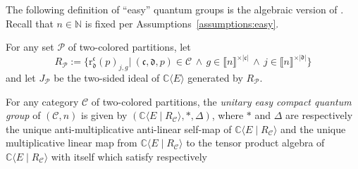 \documentclass[10pt,a4paper]{amsart}
\numberwithin{equation}{section}
\newcommand{\freealg}[2]{#1\langle #2\rangle}
\newcommand{\univalg}[3]{#1\langle #2 \classpredicate #3\rangle}
\newcommand{\Scomultiplication}{\Delta}
\newcommand{\Sstar}{\ast}
\newcommand{\Sand}{\,\wedge\,}
\newcommand{\classpredicate}{\mid}
\newcommand{\pint}{\mathbb{N}}
\newcommand{\comps}{\mathbb{C}}
\newcommand{\dwi}[1]{\llbracket{#1}\rrbracket}
\newcommand{\Ssetmonoidalproduct}{\times}
\newcommand{\Yc}[1]{\mathfrak{#1}}
\newcommand{\Slength}[1]{|#1|}
\newcommand{\therelpoly}[5]{\mathrm{r}^{#1}_{#2}(#3)_{#4,#5}}
\newcommand{\thedim}{n}
\newcommand{\thegens}{E}
\newcommand{\therels}{R}
\newcommand{\thepartrels}[1]{\therels_{#1}}
\newcommand{\thecat}{\mathcal{C}}
\newcommand{\theideal}{J}
\newcommand{\thepartideal}[1]{\theideal_{#1}}
\begin{document}
{
  \newcommand{\thealg}{A}
  \newcommand{\themultiplication}{\Smultiplication}
  \newcommand{\thecomultiplication}{\Scomultiplication}
  \newcommand{\theunit}{\Sunit}
  \newcommand{\thestar}{\Sstar}
  \newcommand{\thecatgen}{\mathcal{G}}
  \newcommand{\thecatgenextended}{\mathcal{R}}
  \newcommand{\indj}{j}
  \newcommand{\indi}{i}
  \newcommand{\indg}{g}
  \newcommand{\indh}{h}
  \newcommand{\incol}{\Yc{c}}
  \newcommand{\outcol}{\Yc{d}}
  \newcommand{\incolx}[1]{\Yc{c}_{#1}}
  \newcommand{\outcolx}[1]{\Yc{d}_{#1}}
  \newcommand{\inlen}{k}
  \newcommand{\outlen}{\ell}
  \newcommand{\infree}{g}
  \newcommand{\outfree}{j}
  \newcommand{\inbound}{h}
  \newcommand{\outbound}{i}
  \newcommand{\infreex}[1]{g_{#1}}
  \newcommand{\outfreex}[1]{j_{#1}}
  \newcommand{\inboundx}[1]{h_{#1}}
  \newcommand{\outboundx}[1]{i_{#1}}
  \newcommand{\incounter}{a}
  \newcommand{\outcounter}{b}
  \newcommand{\thepartition}{p}
  \newcommand{\sumind}{s}
  \newcommand{\anycol}{\Yc{c}}
  \newcommand{\thepartitionset}{\mathcal{P}}
  \newcommand{\theflip}{\SbraidingX{\thealg}{\thealg}}
  \newcommand{\thepolys}{\freealg{\comps}{\thegens}}
      The following definition of ``easy'' quantum groups is the algebraic version of \cite[Definition~5.1]{TarragoWeber2016}. Recall that $\thedim\in\pint$ is fixed per Assumptions~\ref{assumptions:easy}.
      \begin{Notation}
        \label{notation:relations_of_partition_set}
 For any set $\thepartitionset$ of two-colored partitions, let
    \[
      \thepartrels{\thepartitionset} :=\big\{ \therelpoly{\incol}{\outcol}{\thepartition}{\outfree}{\infree}    \vert \  (\incol,\outcol,\thepartition)\in \thecat\Sand \infree\in\dwi{\thedim}^{\Ssetmonoidalproduct\Slength{\incol}}\Sand\outfree\in\dwi{\thedim}^{\Ssetmonoidalproduct\Slength{\outcol}}\big\}
    \]
    and let $\thepartideal{\thepartitionset}$ be the two-sided ideal of $\thepolys$ generated by $\thepartrels{\thepartitionset}$.
      \end{Notation}
      \begin{Definition}
        \label{definition:easy-quantum-group}
      For any category $\thecat$  of two-co\-lo\-red partitions, the \emph{unitary easy compact quantum group} of $(\thecat,\thedim)$ is given by $(\univalg{\comps}{\thegens}{\thepartrels{\thecat}},\thestar,\thecomultiplication)$,
    where $\thestar$ and $\thecomultiplication$ are respectively the unique anti-multiplicative anti-linear self-map of $\univalg{\comps}{\thegens}{\thepartrels{\thecat}}$ and the unique multiplicative linear map from $\univalg{\comps}{\thegens}{\thepartrels{\thecat}}$ to the tensor product algebra of $\univalg{\comps}{\thegens}{\thepartrels{\thecat}}$ with itself which satisfy respectively%

\end{Definition}}
\end{document}

